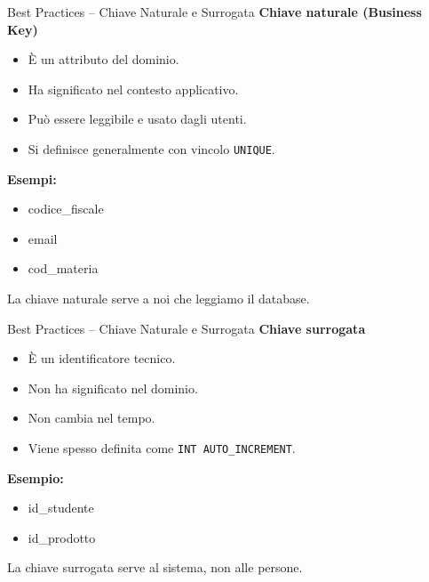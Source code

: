 \documentclass{beamer}
\begin{document}
\begin{frame}{Best Practices -- Chiave Naturale e Surrogata}
\small
\textbf{Chiave naturale (Business Key)}

\begin{itemize}
    \item È un attributo del dominio.
    \item Ha significato nel contesto applicativo.
    \item Può essere leggibile e usato dagli utenti.
    \item Si definisce generalmente con vincolo \texttt{UNIQUE}.
\end{itemize}

\medskip
\textbf{Esempi:}
\begin{itemize}
    \item codice\_fiscale
    \item email
    \item cod\_materia
\end{itemize}

\medskip
\alert{La chiave naturale serve a noi che leggiamo il database.}
\end{frame}
\begin{frame}[fragile]{Best Practices -- Chiave Naturale e Surrogata}
\small
\textbf{Chiave surrogata}

\begin{itemize}
    \item È un identificatore tecnico.
    \item Non ha significato nel dominio.
    \item Non cambia nel tempo.
    \item Viene spesso definita come \texttt{INT AUTO\_INCREMENT}.
\end{itemize}

\medskip
\textbf{Esempio:}
\begin{itemize}
    \item id\_studente
    \item id\_prodotto
\end{itemize}

\medskip
\alert{La chiave surrogata serve al sistema, non alle persone.}
\end{frame}
\end{document}
